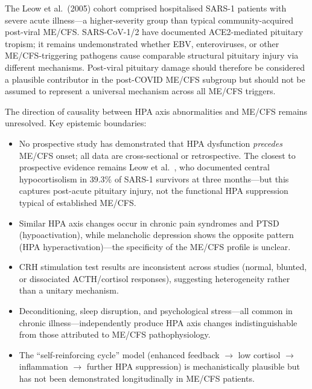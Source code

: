 \begin{limitation}
The Leow et al.\ (2005) cohort comprised hospitalised SARS-1 patients with severe acute illness---a higher-severity group than typical community-acquired post-viral ME/CFS. SARS-CoV-1/2 have documented ACE2-mediated pituitary tropism; it remains undemonstrated whether EBV, enteroviruses, or other ME/CFS-triggering pathogens cause comparable structural pituitary injury via different mechanisms. Post-viral pituitary damage should therefore be considered a plausible contributor in the post-COVID ME/CFS subgroup but should not be assumed to represent a universal mechanism across all ME/CFS triggers.
\end{limitation}

\begin{limitation}
The direction of causality between HPA axis abnormalities and ME/CFS remains unresolved. Key epistemic boundaries:
\begin{itemize}
    \item No prospective study has demonstrated that HPA dysfunction \emph{precedes} ME/CFS onset; all data are cross-sectional or retrospective. The closest to prospective evidence remains Leow et al.~\cite{Leow2005sars}, who documented central hypocortisolism in 39.3\% of SARS-1 survivors at three months---but this captures post-acute pituitary injury, not the functional HPA suppression typical of established ME/CFS.
    \item Similar HPA axis changes occur in chronic pain syndromes and PTSD (hypoactivation), while melancholic depression shows the opposite pattern (HPA hyperactivation)---the specificity of the ME/CFS profile is unclear.
    \item CRH stimulation test results are inconsistent across studies (normal, blunted, or dissociated ACTH/cortisol responses), suggesting heterogeneity rather than a unitary mechanism.
    \item Deconditioning, sleep disruption, and psychological stress---all common in chronic illness---independently produce HPA axis changes indistinguishable from those attributed to ME/CFS pathophysiology.
    \item The ``self-reinforcing cycle'' model (enhanced feedback $\to$ low cortisol $\to$ inflammation $\to$ further HPA suppression) is mechanistically plausible but has not been demonstrated longitudinally in ME/CFS patients.
\end{itemize}
\end{limitation}

